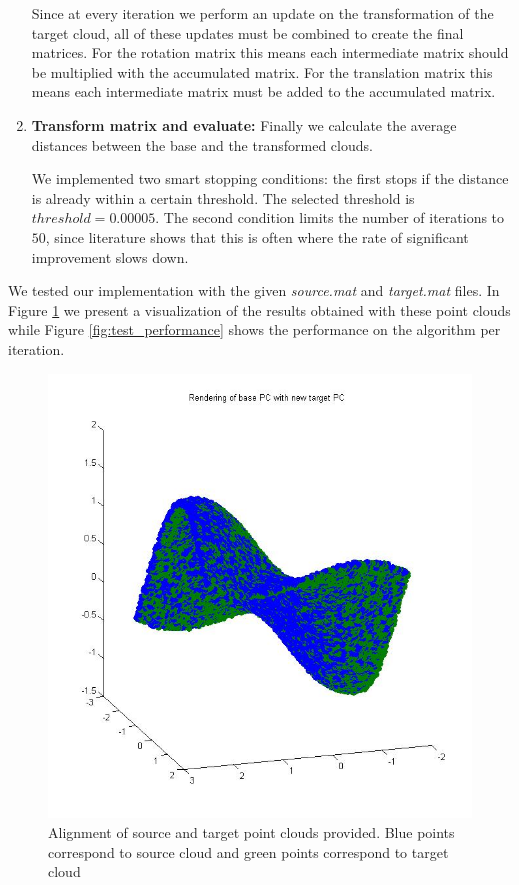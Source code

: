 \documentclass[11pt]{article}
\begin{document}
\begin{enumerate}
	Since at every iteration we perform an update on the transformation of the target cloud, all of these updates must be combined to create the final matrices. For the rotation matrix this means each intermediate matrix should be multiplied with the accumulated matrix. For the translation matrix this means each intermediate matrix must be added to the accumulated matrix.
	
	\item \textbf{Transform matrix and evaluate:} Finally we calculate the average distances between the base and the transformed clouds. 
	
	We implemented two smart stopping conditions: the first stops if the distance is already within a certain threshold. The selected threshold is $ threshold = 0.00005 $. The second condition limits the number of iterations to $50$, since literature shows that this is often where the rate of significant improvement slows down.
\end{enumerate}

We tested our implementation with the given \textit{source.mat} and \textit{target.mat} files. In Figure \ref{fig:test} we present a visualization of the results obtained with these point clouds while Figure \ref{fig:test_performance} shows the performance on the algorithm per iteration.

\begin{figure}[H]
	\centering
	\includegraphics[width=.6\textwidth]{img/test_clouds.jpg}
	\caption{Alignment of source and target point clouds provided. Blue points correspond to source cloud and green points correspond to target cloud}
	\label{fig:test}
\end{figure}
\end{document}
